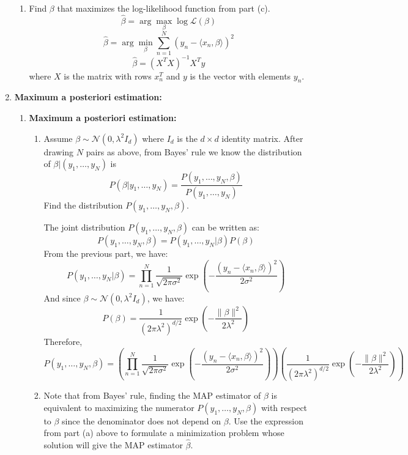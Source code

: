 \documentclass[a3paper,12pt]{extarticle} %
\begin{document}
\begin{enumerate}
\begin{enumerate}
        \item Find \( \beta \) that maximizes the log-likelihood function from part (c).
        \[
            \hat{\beta} = \arg \max_{\beta} \log \mathcal{L}(\beta)
        \]
        \[
            \hat{\beta} = \arg \min_{\beta} \sum_{n=1}^N (y_n - \langle x_n, \beta \rangle)^2
        \]
        \[
            \hat{\beta} = (X^T X)^{-1} X^T y
        \]
        where \( X \) is the matrix with rows \( x_n^T \) and \( y \) is the vector with elements \( y_n \).
    \end{enumerate}
    \item \textbf{Maximum a posteriori estimation:}
    \begin{enumerate}
        \item \textbf{Maximum a posteriori estimation:}
        \begin{enumerate}
            \item Assume \( \beta \sim \mathcal{N}(0, \lambda^2 I_d) \) where \( I_d \) is the \( d \times d \) identity matrix.
            After drawing \( N \) pairs as above, from Bayes' rule we know the distribution of \( \beta | (y_1, \ldots, y_N) \) is
            \[
                P(\beta | y_1, \ldots, y_N) = \frac{P(y_1, \ldots, y_N, \beta)}{P(y_1, \ldots, y_N)}
            \]
            Find the distribution \( P(y_1, \ldots, y_N, \beta) \).

            The joint distribution \( P(y_1, \ldots, y_N, \beta) \) can be written as:
            \[
                P(y_1, \ldots, y_N, \beta) = P(y_1, \ldots, y_N | \beta) P(\beta)
            \]
            From the previous part, we have:
            \[
                P(y_1, \ldots, y_N | \beta) = \prod_{n=1}^N \frac{1}{\sqrt{2 \pi \sigma^2}} \exp \left( -\frac{(y_n - \langle x_n, \beta \rangle)^2}{2 \sigma^2} \right)
            \]
            And since \( \beta \sim \mathcal{N}(0, \lambda^2 I_d) \), we have:
            \[
                P(\beta) = \frac{1}{(2 \pi \lambda^2)^{d/2}} \exp \left( -\frac{\|\beta\|^2}{2 \lambda^2} \right)
            \]
            Therefore,
            \[
                P(y_1, \ldots, y_N, \beta) = \left( \prod_{n=1}^N \frac{1}{\sqrt{2 \pi \sigma^2}} \exp \left( -\frac{(y_n - \langle x_n, \beta \rangle)^2}{2 \sigma^2} \right) \right) \left( \frac{1}{(2 \pi \lambda^2)^{d/2}} \exp \left( -\frac{\|\beta\|^2}{2 \lambda^2} \right) \right)
            \]

            \item Note that from Bayes' rule, finding the MAP estimator of \( \beta \) is equivalent to maximizing the numerator \( P(y_1, \ldots, y_N, \beta) \) with respect to \( \beta \) since the denominator does not depend on \( \beta \). Use the expression from part (a) above to formulate a minimization problem whose solution will give the MAP estimator \( \hat{\beta} \).


\end{enumerate}
\end{enumerate}
\end{enumerate}
\end{document}
